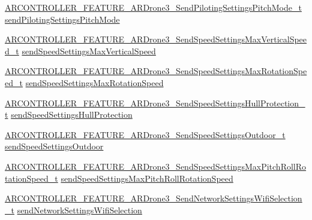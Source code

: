\begin{DoxyCompactItemize}
\hyperlink{_a_r_c_o_n_t_r_o_l_l_e_r___feature_8h_a315f806c5445e0cc7457e2ddb9699e31}{A\+R\+C\+O\+N\+T\+R\+O\+L\+L\+E\+R\+\_\+\+F\+E\+A\+T\+U\+R\+E\+\_\+\+A\+R\+Drone3\+\_\+\+Send\+Piloting\+Settings\+Pitch\+Mode\+\_\+t} \hyperlink{struct_a_r_c_o_n_t_r_o_l_l_e_r___f_e_a_t_u_r_e___a_r_drone3__t_a21505619f55b72cde60ad81f98e79414}{send\+Piloting\+Settings\+Pitch\+Mode}
\item 
\hyperlink{_a_r_c_o_n_t_r_o_l_l_e_r___feature_8h_a53a34ead5b2ea21d93d53c4cc23b0c4f}{A\+R\+C\+O\+N\+T\+R\+O\+L\+L\+E\+R\+\_\+\+F\+E\+A\+T\+U\+R\+E\+\_\+\+A\+R\+Drone3\+\_\+\+Send\+Speed\+Settings\+Max\+Vertical\+Speed\+\_\+t} \hyperlink{struct_a_r_c_o_n_t_r_o_l_l_e_r___f_e_a_t_u_r_e___a_r_drone3__t_a97d746abdbe32baad11c922b735ebdd2}{send\+Speed\+Settings\+Max\+Vertical\+Speed}
\item 
\hyperlink{_a_r_c_o_n_t_r_o_l_l_e_r___feature_8h_a7451fb752a4a8457c67d3d39052bea09}{A\+R\+C\+O\+N\+T\+R\+O\+L\+L\+E\+R\+\_\+\+F\+E\+A\+T\+U\+R\+E\+\_\+\+A\+R\+Drone3\+\_\+\+Send\+Speed\+Settings\+Max\+Rotation\+Speed\+\_\+t} \hyperlink{struct_a_r_c_o_n_t_r_o_l_l_e_r___f_e_a_t_u_r_e___a_r_drone3__t_a02d5853d296fca1c08619e439b55c76d}{send\+Speed\+Settings\+Max\+Rotation\+Speed}
\item 
\hyperlink{_a_r_c_o_n_t_r_o_l_l_e_r___feature_8h_a9fcac421e9d30cb4cb42e7a1118422a4}{A\+R\+C\+O\+N\+T\+R\+O\+L\+L\+E\+R\+\_\+\+F\+E\+A\+T\+U\+R\+E\+\_\+\+A\+R\+Drone3\+\_\+\+Send\+Speed\+Settings\+Hull\+Protection\+\_\+t} \hyperlink{struct_a_r_c_o_n_t_r_o_l_l_e_r___f_e_a_t_u_r_e___a_r_drone3__t_a0954e149642cb6e173ed77a50515fd5e}{send\+Speed\+Settings\+Hull\+Protection}
\item 
\hyperlink{_a_r_c_o_n_t_r_o_l_l_e_r___feature_8h_a99daf53e870754d115174657cbe2129f}{A\+R\+C\+O\+N\+T\+R\+O\+L\+L\+E\+R\+\_\+\+F\+E\+A\+T\+U\+R\+E\+\_\+\+A\+R\+Drone3\+\_\+\+Send\+Speed\+Settings\+Outdoor\+\_\+t} \hyperlink{struct_a_r_c_o_n_t_r_o_l_l_e_r___f_e_a_t_u_r_e___a_r_drone3__t_a09e5d7b7f5f1d75d2323dea1e0ca7749}{send\+Speed\+Settings\+Outdoor}
\item 
\hyperlink{_a_r_c_o_n_t_r_o_l_l_e_r___feature_8h_a9e1d9c635d5c33ab45534de84a57bccc}{A\+R\+C\+O\+N\+T\+R\+O\+L\+L\+E\+R\+\_\+\+F\+E\+A\+T\+U\+R\+E\+\_\+\+A\+R\+Drone3\+\_\+\+Send\+Speed\+Settings\+Max\+Pitch\+Roll\+Rotation\+Speed\+\_\+t} \hyperlink{struct_a_r_c_o_n_t_r_o_l_l_e_r___f_e_a_t_u_r_e___a_r_drone3__t_a3f05446cd591d5426e72cde833770da7}{send\+Speed\+Settings\+Max\+Pitch\+Roll\+Rotation\+Speed}
\item 
\hyperlink{_a_r_c_o_n_t_r_o_l_l_e_r___feature_8h_a6009d9a35d040847843e3976831aea46}{A\+R\+C\+O\+N\+T\+R\+O\+L\+L\+E\+R\+\_\+\+F\+E\+A\+T\+U\+R\+E\+\_\+\+A\+R\+Drone3\+\_\+\+Send\+Network\+Settings\+Wifi\+Selection\+\_\+t} \hyperlink{struct_a_r_c_o_n_t_r_o_l_l_e_r___f_e_a_t_u_r_e___a_r_drone3__t_a7f5c7d533796b8fb86d7b3b24ff30f0f}{send\+Network\+Settings\+Wifi\+Selection}

\end{DoxyCompactItemize}
